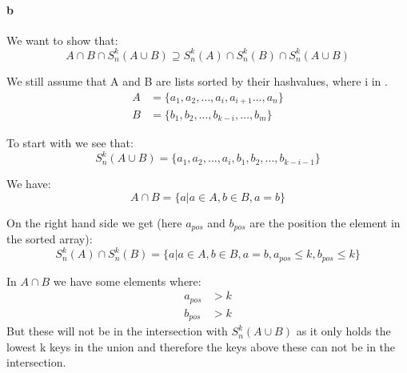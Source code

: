 \paragraph{b}

We want to show that:
\begin{equation*}
    A \cap B \cap S^{k}_{n}(A \cup B) \supseteq S^{k}_{n}(A) \cap S^{k}_{n}(B) \cap S^{k}_{n}(A \cup B)
\end{equation*}

We still assume that A and B are lists sorted by their hashvalues, where i in .
\begin{align*}
    A &=\{a_1, a_2, \dots , a_{i}, a_{i+1} \dots  , a_n\}\\
    B &=\{b_1, b_2, \dots , b_{k-i}, \dots , b_m\}
\end{align*}

To start with we see that:
\begin{equation*}
    S^{k}_{n}(A\cup B) =\{a_1, a_2, \dots , a_{i}, b_1, b_2, \dots , b_{k-i-1}\}
\end{equation*}

We have:
\begin{equation*}
    A \cap B = \{ a | a \in A, b \in B, a = b\}
\end{equation*}

On the right hand side we get (here $a_{pos}$ and $b_{pos}$ are the position the element
in the sorted array):
\begin{equation*}
    S^{k}_{n}(A) \cap S^{k}_{n}(B) = \{a | a \in A, b \in B, a = b, a_{pos} \le k, b_{pos} \le k\}
\end{equation*}

In $A \cap B$ we have some elements where:
\begin{align*}
    a_{pos} & > k \\
    b_{pos} & > k
\end{align*}
But these will not be in the intersection with $S^{k}_{n}(A \cup B)$ as it only
holds the lowest k keys in the union and therefore the keys above these can not
be in the intersection.
